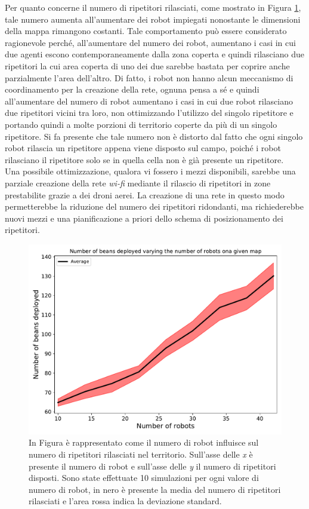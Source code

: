 Per quanto concerne il numero di ripetitori rilasciati, come mostrato in Figura \ref{fig:robotsbeans}, tale numero aumenta all'aumentare dei robot impiegati nonostante le dimensioni della mappa rimangono costanti.
Tale comportamento può essere considerato ragionevole perché, all'aumentare del numero dei robot, aumentano i casi in cui due agenti escono contemporaneamente dalla zona coperta e quindi rilasciano due ripetitori la cui area coperta di uno dei due sarebbe bastata per coprire anche parzialmente l'area dell'altro.
Di fatto, i robot non hanno alcun meccanismo di coordinamento per la creazione della rete, ognuna pensa a sé e quindi all'aumentare del numero di robot aumentano i casi in cui due robot rilasciano due ripetitori vicini tra loro, non ottimizzando l'utilizzo del singolo ripetitore e portando quindi a molte porzioni di territorio coperte da più di un singolo ripetitore.
Si fa presente che tale numero non è distorto dal fatto che ogni singolo robot rilascia un ripetitore appena viene disposto sul campo, poiché i robot rilasciano il ripetitore solo se in quella cella non è già presente un ripetitore.\\
Una possibile ottimizzazione, qualora vi fossero i mezzi disponibili, sarebbe una parziale creazione della rete \textit{wi-fi} mediante il rilascio di ripetitori in zone prestabilite grazie a dei droni aerei. La creazione di una rete in questo modo permetterebbe la riduzione del numero dei ripetitori ridondanti, ma richiederebbe nuovi mezzi e una pianificazione a priori dello schema di posizionamento dei ripetitori.
\begin{figure}
	\centering
	\includegraphics[width=0.9\linewidth]{images/macro_results/robots_beans}
	\caption{In Figura è rappresentato come il numero di robot influisce sul numero di ripetitori rilasciati nel territorio. Sull'asse delle \textit{x} è presente il numero di robot e sull'asse delle \textit{y} il numero di ripetitori disposti. Sono state effettuate 10 simulazioni per ogni valore di numero di robot, in nero è presente la media del numero di ripetitori rilasciati e l'area rossa indica la deviazione standard.}
	\label{fig:robotsbeans}
\end{figure}


